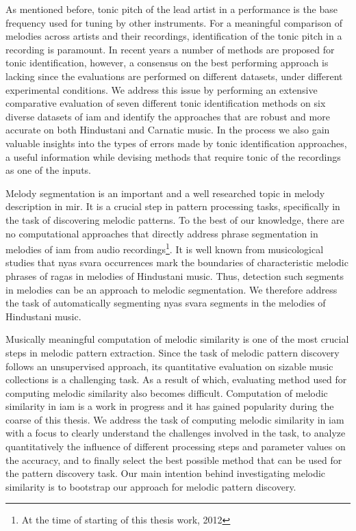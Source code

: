 As mentioned before, tonic pitch of the lead artist in a performance is the base frequency used for tuning by other instruments. For a meaningful comparison of melodies across artists and their recordings, identification of the tonic pitch in a recording is paramount. In recent years a number of methods are proposed for tonic identification, however, a consensus on the best performing approach is lacking since the evaluations are performed on different datasets, under different experimental conditions. We address this issue by performing an extensive comparative evaluation of seven different tonic identification methods on six diverse datasets of \gls{iam} and identify the approaches that are robust and more accurate on both Hindustani and Carnatic music. In the process we also gain valuable insights into the types of errors made by tonic identification approaches, a useful information while devising methods that require tonic of the recordings as one of the inputs.

Melody segmentation is an important and a well researched topic in melody description in \gls{mir}. It is a crucial step in pattern processing tasks, specifically in the task of discovering melodic patterns. To the best of our knowledge, there are no computational approaches that directly address phrase segmentation in melodies of \gls{iam} from audio recordings\footnote{At the time of starting of this thesis work, 2012}. It is well known from musicological studies that \gls{nyas} \gls{svara} occurrences mark the boundaries of characteristic melodic phrases of \glspl{raga} in melodies of Hindustani music. Thus, detection such segments in melodies can be an approach to melodic segmentation. We therefore address the task of automatically segmenting \gls{nyas} \gls{svara} segments in the melodies of Hindustani music. 

Musically meaningful computation of melodic similarity is one of the most crucial steps in melodic pattern extraction. Since the task of melodic pattern discovery follows an unsupervised approach, its quantitative evaluation on sizable music collections is a challenging task. As a result of which, evaluating method used for computing melodic similarity also becomes difficult. Computation of melodic similarity in \gls{iam} is a work in progress and it has gained popularity during the coarse of this thesis. We address the task of computing melodic similarity in \gls{iam} with a focus to clearly understand the challenges involved in the task, to analyze quantitatively the influence of different processing steps and parameter values on the accuracy, and to finally select the best possible method that can be used for the pattern discovery task. Our main intention behind investigating melodic similarity is to bootstrap our approach for melodic pattern discovery. 

